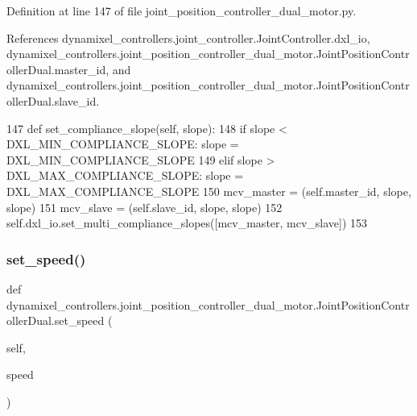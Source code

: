 Definition at line 147 of file joint\+\_\+position\+\_\+controller\+\_\+dual\+\_\+motor.\+py.



References dynamixel\+\_\+controllers.\+joint\+\_\+controller.\+Joint\+Controller.\+dxl\+\_\+io, dynamixel\+\_\+controllers.\+joint\+\_\+position\+\_\+controller\+\_\+dual\+\_\+motor.\+Joint\+Position\+Controller\+Dual.\+master\+\_\+id, and dynamixel\+\_\+controllers.\+joint\+\_\+position\+\_\+controller\+\_\+dual\+\_\+motor.\+Joint\+Position\+Controller\+Dual.\+slave\+\_\+id.


\begin{DoxyCode}
147     \textcolor{keyword}{def }set\_compliance\_slope(self, slope):
148         \textcolor{keywordflow}{if} slope < DXL\_MIN\_COMPLIANCE\_SLOPE: slope = DXL\_MIN\_COMPLIANCE\_SLOPE
149         \textcolor{keywordflow}{elif} slope > DXL\_MAX\_COMPLIANCE\_SLOPE: slope = DXL\_MAX\_COMPLIANCE\_SLOPE
150         mcv\_master = (self.master\_id, slope, slope)
151         mcv\_slave = (self.slave\_id, slope, slope)
152         self.dxl\_io.set\_multi\_compliance\_slopes([mcv\_master, mcv\_slave])
153 
\end{DoxyCode}
\mbox{\label{classdynamixel__controllers_1_1joint__position__controller__dual__motor_1_1_joint_position_controller_dual_a5674e2c2206f1442001ba7684fdf5dcc}} 
\subsubsection{\texorpdfstring{set\+\_\+speed()}{set\_speed()}}
{\footnotesize\ttfamily def dynamixel\+\_\+controllers.\+joint\+\_\+position\+\_\+controller\+\_\+dual\+\_\+motor.\+Joint\+Position\+Controller\+Dual.\+set\+\_\+speed (\begin{DoxyParamCaption}\item[{}]{self,  }\item[{}]{speed }\end{DoxyParamCaption})}



